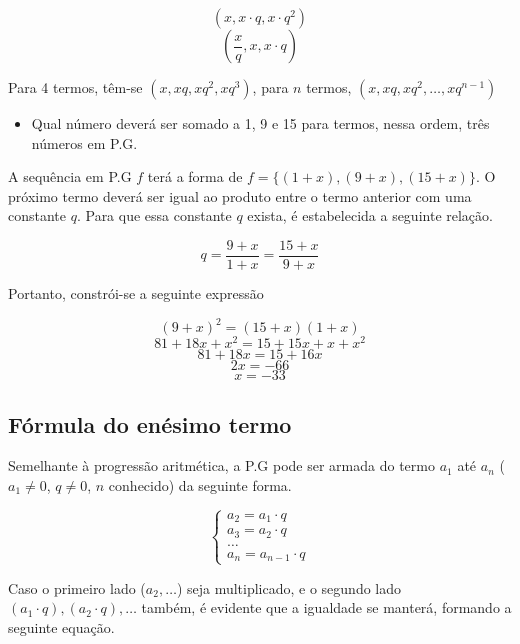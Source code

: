 \documentclass[11pt]{article}
\begin{document}
\[\left(x, x\cdot q, x\cdot q^{2}\right)\]
\[\left(\frac{x}{q}, x, x\cdot q\right)\]

Para 4 termos, têm-se $\left(x, xq, xq^{2}, xq^{3}\right)$, para $n$ termos, $\left(x, xq, xq^{2}, \dots, xq^{n - 1}\right)$

\begin{tcolorbox}[colback=LightYellow]
  \begin{itemize}
    \item Qual número deverá ser somado a 1, 9 e 15 para termos, nessa ordem, três números em P.G.
  \end{itemize}
\end{tcolorbox}

\begin{tcolorbox}[colback=LightYellow]
  A sequência em P.G $f$ terá a forma de $f = \{(1 + x), (9 + x), (15 + x)\}$. O próximo termo deverá ser igual ao produto entre o termo anterior com uma constante $q$. Para que essa constante $q$ exista, é estabelecida a seguinte relação.

  \[q = \frac{9 + x}{1 + x} = \frac{15 + x}{9 + x}\]

  Portanto, constrói-se a seguinte expressão

  \[(9 + x)^{2} = (15 + x)(1 + x)\]
  \[81 + 18x + x^{2} = 15 + 15x + x + x^{2}\]
  \[81 + 18x = 15 + 16x\]
  \[2x = -66\]
  \[x = -33\]
\end{tcolorbox}

\subsection{Fórmula do enésimo termo}

Semelhante à progressão aritmética, a P.G pode ser armada do termo $a_{1}$ até $a_{n}$ ($a_{1} \neq 0$, $q \neq 0$, $n$ conhecido) da seguinte forma.

\begin{equation*}
\begin{cases}
  a_{2} = a_{1}\cdot q \\
  a_{3} = a_{2}\cdot q \\
  \dots \\
  a_{n} = a_{n - 1} \cdot q
\end{cases}
\end{equation*}

Caso o primeiro lado ($a_{2}, \dots$) seja multiplicado, e o segundo lado $(a_{1}\cdot q), (a_{2}\cdot q), \dots$ também, é evidente que a igualdade se manterá, formando a seguinte equação.
\end{document}
